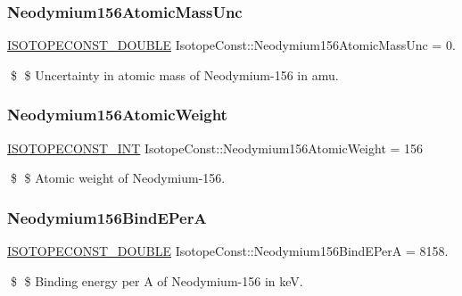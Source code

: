 \subsubsection{\texorpdfstring{Neodymium156\+Atomic\+Mass\+Unc}{Neodymium156AtomicMassUnc}}
{\footnotesize\ttfamily \mbox{\hyperlink{group___isotope_const-_macros_ga8f45a7272ce02c0b4c65c44636ed719a}{I\+S\+O\+T\+O\+P\+E\+C\+O\+N\+S\+T\+\_\+\+D\+O\+U\+B\+LE}} Isotope\+Const\+::\+Neodymium156\+Atomic\+Mass\+Unc = 0.}

\$ \$ Uncertainty in atomic mass of Neodymium-\/156 in amu. \mbox{\label{group___isotope_const-_neodymium-_nd156_ga02e4ee1a4fe7282c0a95c87e5fc872fa}} 
\subsubsection{\texorpdfstring{Neodymium156\+Atomic\+Weight}{Neodymium156AtomicWeight}}
{\footnotesize\ttfamily \mbox{\hyperlink{group___isotope_const-_macros_ga5f18360b3e99483a35c32d789e62621c}{I\+S\+O\+T\+O\+P\+E\+C\+O\+N\+S\+T\+\_\+\+I\+NT}} Isotope\+Const\+::\+Neodymium156\+Atomic\+Weight = 156}

\$ \$ Atomic weight of Neodymium-\/156. \mbox{\label{group___isotope_const-_neodymium-_nd156_gaa8d5d1fab9398e5e3eaa76a9e3233d39}} 
\subsubsection{\texorpdfstring{Neodymium156\+Bind\+E\+PerA}{Neodymium156BindEPerA}}
{\footnotesize\ttfamily \mbox{\hyperlink{group___isotope_const-_macros_ga8f45a7272ce02c0b4c65c44636ed719a}{I\+S\+O\+T\+O\+P\+E\+C\+O\+N\+S\+T\+\_\+\+D\+O\+U\+B\+LE}} Isotope\+Const\+::\+Neodymium156\+Bind\+E\+PerA = 8158.}

\$ \$ Binding energy per A of Neodymium-\/156 in keV. \mbox{\label{group___isotope_const-_neodymium-_nd156_ga321244437399c3f4e04794d5345be948}} 
